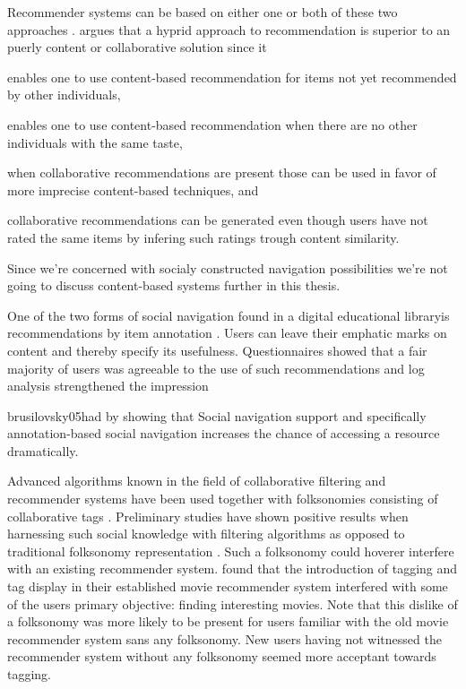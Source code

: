 Recommender systems can be based on either one or both of these two approaches
\citep[]{herlocker00}. \citet[]{balabanovic97} argues that a
hyprid approach to recommendation is superior to an puerly content or
collaborative solution since it
\begin{inparaenum}[(i)]
  \item enables one to use content-based recommendation for items
    not yet recommended by other individuals,
  \item enables one to use content-based recommendation when there are
    no other individuals with the same taste,
  \item when collaborative recommendations are present those can be
    used in favor of more imprecise content-based techniques, and
  \item collaborative recommendations can be generated even though users
    have not rated the same items by infering such ratings trough content
    similarity.
\end{inparaenum}
Since we're concerned with socialy constructed navigation possibilities we're
not going to discuss content-based systems further in this thesis.

One of the two forms of social navigation found in
\dash{}a digital educational
library\dash{}is recommendations by item
annotation \citep[]{brusilovsky05}. Users can leave their emphatic marks
on content and thereby specify its usefulness. Questionnaires showed that a
fair majority of users was agreeable to the use of such recommendations
\citeyearpar[]{brusilovsky05} and log analysis strengthened
the impression
\begin{fullquote}[\p{38}]{brusilovsky05}{had by showing that}
  Social navigation support and specifically
  annotation-based social navigation increases the chance of
  accessing a resource dramatically.
\end{fullquote}

Advanced algorithms known in the field of collaborative filtering
and recommender systems have been used together with folksonomies
consisting of collaborative tags
\citep[]{wu06}. Preliminary studies have shown positive
results when harnessing such social knowledge with filtering algorithms
as opposed to traditional folksonomy representation
\citep[]{wu06}. Such a folksonomy could hoverer interfere with an
existing recommender system. \citet[]{sen06} found that the
introduction of tagging and tag display in their established
movie recommender system interfered with some of the users primary
objective: finding interesting movies. Note that this dislike of a
folksonomy was more likely to be present for users familiar with the old
movie recommender system sans any folksonomy. New users having not
witnessed the recommender system without any folksonomy seemed more
acceptant towards tagging.

